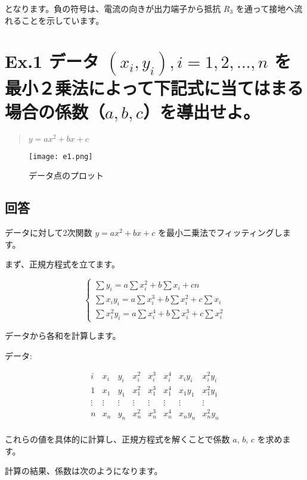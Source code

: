 \documentclass{article}
\begin{document}
となります。負の符号は、電流の向きが出力端子から抵抗 \(R_3\) を通って接地へ流れることを示しています。

\newpage  %

\section*{Ex.1 データ \((x_i, y_i), i=1,2,\dots,n\) を最小２乗法によって下記式に当てはまる場合の係数（\(a, b, c\)）を導出せよ。}
\begin{quote}
\( y = ax^2 + bx + c \)
\end{quote}

\begin{figure}[H]
    \centering
    \texttt{[image: e1.png]}
    \caption{データ点のプロット}
\end{figure}

\subsection*{回答}
データに対して2次関数 \( y = ax^2 + bx + c \) を最小二乗法でフィッティングします。

まず、正規方程式を立てます。

\[
\begin{cases}
\sum y_i = a \sum x_i^2 + b \sum x_i + c n \\
\sum x_i y_i = a \sum x_i^3 + b \sum x_i^2 + c \sum x_i \\
\sum x_i^2 y_i = a \sum x_i^4 + b \sum x_i^3 + c \sum x_i^2
\end{cases}
\]

データから各和を計算します。

データ:

\[
\begin{array}{c|c|c|c|c|c|c|c}
i & x_i & y_i & x_i^2 & x_i^3 & x_i^4 & x_i y_i & x_i^2 y_i \\
\hline
1 & x_1 & y_1 & x_1^2 & x_1^3 & x_1^4 & x_1 y_1 & x_1^2 y_1 \\
\vdots & \vdots & \vdots & \vdots & \vdots & \vdots & \vdots & \vdots \\
n & x_n & y_n & x_n^2 & x_n^3 & x_n^4 & x_n y_n & x_n^2 y_n \\
\end{array}
\]

これらの値を具体的に計算し、正規方程式を解くことで係数 \(a\), \(b\), \(c\) を求めます。

計算の結果、係数は次のようになります。
\end{document}
